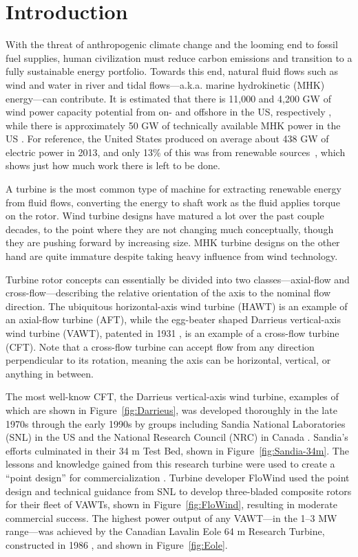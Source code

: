 \chapter{Introduction}

With the threat of anthropogenic climate change and the looming end to fossil
fuel supplies, human civilization must reduce carbon emissions \cite{Hansen2013}
and transition to a fully sustainable energy portfolio. Towards this end,
natural fluid flows such as wind and water in river and tidal flows---a.k.a.
marine hydrokinetic (MHK) energy---can contribute. It is estimated that there is
11,000 and 4,200 GW of wind power capacity potential from on- and offshore in
the US, respectively \cite{Lopez2012}, while there is approximately 50 GW of
technically available MHK power in the US \cite{Haas2011, Jacobson2012,
    Haas2013}. For reference, the United States produced on average about 438 GW of
electric power in 2013, and only 13\% of this was from renewable
sources~\cite{EIA2015}, which shows just how much work there is left to be done.

A turbine is the most common type of machine for extracting renewable energy
from fluid flows, converting the energy to shaft work as the fluid applies
torque on the rotor. Wind turbine designs have matured a lot over the past
couple decades, to the point where they are not changing much conceptually,
though they are pushing forward by increasing size. MHK turbine designs on the
other hand are quite immature despite taking heavy influence from wind
technology.

Turbine rotor concepts can essentially be divided into two classes---axial-flow
and cross-flow---describing the relative orientation of the axis to the nominal
flow direction. The ubiquitous horizontal-axis wind turbine (HAWT) is an example
of an axial-flow turbine (AFT), while the egg-beater shaped Darrieus
vertical-axis wind turbine (VAWT), patented in 1931 \cite{Darrieus1931}, is an
example of a cross-flow turbine (CFT). Note that a cross-flow turbine can accept
flow from any direction perpendicular to its rotation, meaning the axis can be
horizontal, vertical, or anything in between.

The most well-know CFT, the Darrieus vertical-axis wind turbine, examples of
which are shown in Figure~\ref{fig:Darrieus}, was developed thoroughly in the
late 1970s through the early 1990s by groups including Sandia National
Laboratories (SNL) in the US and the National Research Council (NRC) in Canada
\cite{Para2002}. Sandia's efforts culminated in their 34 m Test Bed, shown in
Figure~\ref{fig:Sandia-34m}. The lessons and knowledge gained from this research
turbine were used to create a ``point design'' for commercialization
\cite{Sutherland2012}. Turbine developer FloWind used the point design and
technical guidance from SNL to develop three-bladed composite rotors for their
fleet of VAWTs, shown in Figure~\ref{fig:FloWind}, resulting in moderate
commercial success. The highest power output of any VAWT---in the 1--3 MW
range---was achieved by the Canadian Lavalin Eole 64 m Research Turbine,
constructed in 1986 \cite{Para2002}, and shown in Figure~\ref{fig:Eole}.

